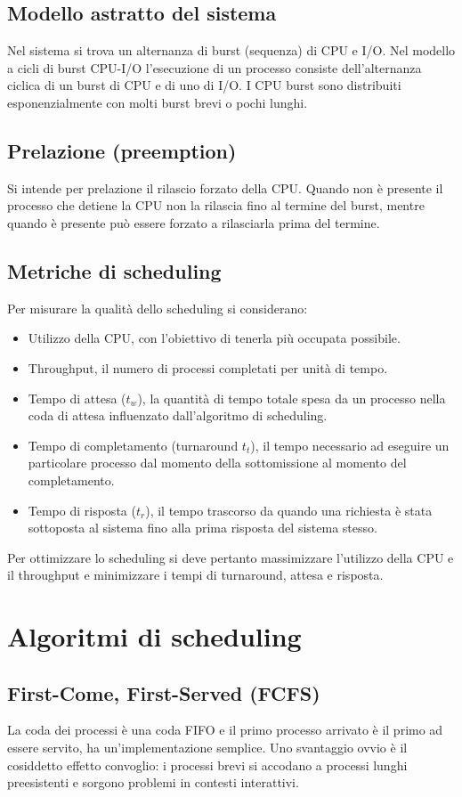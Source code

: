 \subsection{Modello astratto del sistema}
Nel sistema si trova un alternanza di burst (sequenza) di CPU e I/O. Nel modello a cicli di burst CPU-I/O l'esecuzione di un processo  consiste dell'alternanza ciclica di un burst di CPU
e di uno di I/O. I CPU burst sono distribuiti esponenzialmente con molti burst brevi o pochi lunghi. 
\subsection{Prelazione (preemption)}
Si intende per prelazione il rilascio forzato della CPU. Quando non \`e presente il processo che detiene la CPU non la rilascia fino al termine del burst, mentre quando \`e presente 
pu\`o essere forzato a rilasciarla prima del termine. 
\subsection{Metriche di scheduling}
Per misurare la qualit\`a dello scheduling si considerano:
\begin{itemize}
	\item Utilizzo della CPU, con l'obiettivo di tenerla pi\`u occupata possibile.
	\item Throughput, il numero di processi completati per unit\`a di tempo.
	\item Tempo di attesa ($t_w$), la quantit\`a di tempo totale spesa da un processo nella coda di attesa influenzato dall'algoritmo di scheduling.
	\item Tempo di completamento (turnaround $t_t$), il tempo necessario ad eseguire un particolare processo dal momento della sottomissione al momento del completamento.
	\item Tempo di risposta ($t_r$), il tempo trascorso da quando una richiesta \`e stata sottoposta al sistema fino alla prima risposta del sistema stesso.
\end{itemize}
Per ottimizzare lo scheduling si deve pertanto massimizzare l'utilizzo della CPU e il throughput e minimizzare i tempi di turnaround, attesa e risposta.
\section{Algoritmi di scheduling}
\subsection{First-Come, First-Served (FCFS)}
La coda dei processi \`e una coda FIFO e il primo processo arrivato \`e il primo ad essere servito, ha un'implementazione semplice. Uno svantaggio ovvio \`e il cosiddetto effetto
convoglio: i processi brevi si accodano a processi lunghi preesistenti e sorgono problemi in contesti interattivi. 
